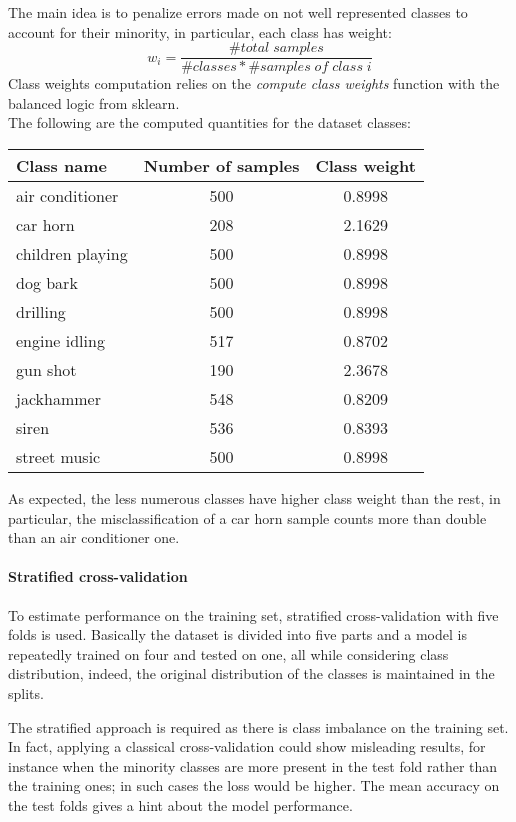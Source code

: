 The main idea is to penalize errors made on not well represented classes to account 
for their minority, in particular, each class has weight:
$$w_i = \frac{\#\mathit{total\;samples}}{\#\mathit{classes} * \#\mathit{samples\;of\;class\;i}}$$
Class weights computation relies on the \emph{compute class weights} function with the balanced logic
from sklearn.~\cite{classweight}\\
The following are the computed quantities for the dataset classes:
\begin{center}
    \begin{tabular}{ |l|c|c| } 
        \hline
        Class name & Number of samples & Class weight \\
        \hline
        air conditioner & 500 & 0.8998 \\
        car horn & 208 & 2.1629 \\
        children playing & 500 & 0.8998 \\
        dog bark & 500 & 0.8998 \\
        drilling & 500 & 0.8998 \\
        engine idling & 517 & 0.8702 \\
        gun shot & 190 & 2.3678 \\
        jackhammer & 548 & 0.8209 \\
        siren & 536 & 0.8393 \\
        street music & 500 & 0.8998 \\
        \hline
    \end{tabular}
\end{center}
As expected, the less numerous classes have higher class weight than the rest,
in particular, the misclassification of a car horn sample
counts more than double than an air conditioner one.

\paragraph{Stratified cross-validation}
To estimate performance on the training set, stratified cross-validation with 
five folds is used. Basically the dataset is divided into five parts 
and a model is repeatedly trained on four and tested on one, all while considering class 
distribution, indeed, the original distribution of the classes is maintained 
in the splits.~\cite{stratified}

The stratified approach is required as there is class imbalance on the training set.
In fact, applying a classical cross-validation could show misleading results, 
for instance when the minority classes are more present 
in the test fold rather than the training ones; in such cases the loss would be 
higher.
The mean accuracy on the test folds gives a hint about the model performance.

